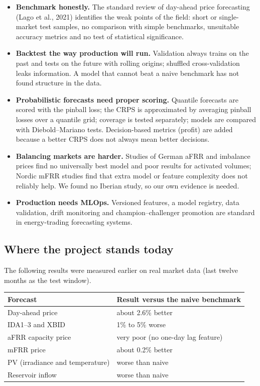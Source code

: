 \documentclass[11pt,a4paper]{article}
\begin{document}
\begin{itemize}
\item \textbf{Benchmark honestly.} The standard review of day-ahead price forecasting
  (Lago et al., 2021) identifies the weak points of the field: short or single-market test
  samples, no comparison with simple benchmarks, unsuitable accuracy metrics and no test of
  statistical significance.
\item \textbf{Backtest the way production will run.} Validation always trains on the past and tests on the
  future with rolling origins; shuffled cross-validation leaks information. A model that cannot beat a
  naive benchmark has not found structure in the data.
\item \textbf{Probabilistic forecasts need proper scoring.} Quantile forecasts are scored with the
  pinball loss; the CRPS is approximated by averaging pinball losses over a quantile grid; coverage is
  tested separately; models are compared with Diebold--Mariano tests. Decision-based metrics
  (profit) are added because a better CRPS does not always mean better decisions.
\item \textbf{Balancing markets are harder.} Studies of German aFRR and imbalance prices find no
  universally best model and poor results for activated volumes; Nordic mFRR studies find that
  extra model or feature complexity does not reliably help. We found no Iberian study, so our own
  evidence is needed.
\item \textbf{Production needs MLOps.} Versioned features, a model registry, data validation, drift
  monitoring and champion--challenger promotion are standard in energy-trading forecasting systems.
\end{itemize}

\subsection*{Where the project stands today}

The following results were measured earlier on real market data (last twelve months as the test window).

\begin{center}
\begin{tabular}{lp{7.6cm}}
\toprule
\textbf{Forecast} & \textbf{Result versus the naive benchmark}\\
\midrule
Day-ahead price & about 2.6\% better\\
IDA1--3 and XBID & 1\% to 5\% worse\\
aFRR capacity price & very poor (no one-day lag feature)\\
mFRR price & about 0.2\% better\\
PV (irradiance and temperature) & worse than naive\\
Reservoir inflow & worse than naive\\
\bottomrule
\end{tabular}
\end{center}
\end{document}
